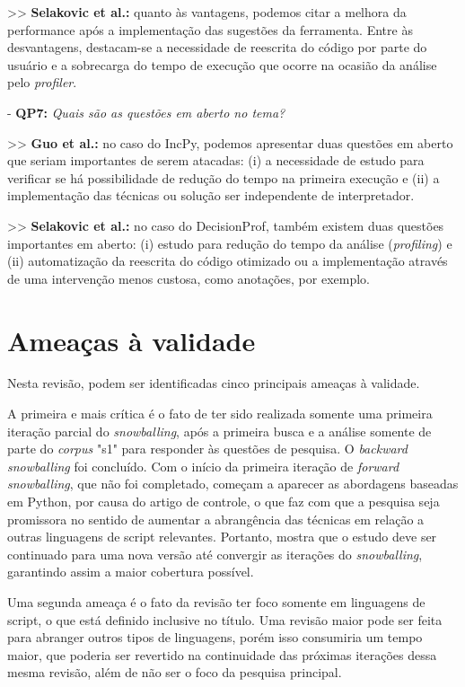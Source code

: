 \documentclass[sigconf]{acmart}
\begin{document}
>> \textbf{Selakovic et al.:} quanto às vantagens, podemos citar a melhora da performance após a implementação das sugestões da ferramenta. Entre às desvantagens, destacam-se a necessidade de reescrita do código por parte do usuário e a sobrecarga do tempo de execução que ocorre na ocasião da análise pelo \textit{profiler}.

- \textbf{QP7:} {\textit{Quais são as questões em aberto no tema?}}

>> \textbf{Guo et al.:} no caso do IncPy, podemos apresentar duas questões em aberto que seriam importantes de serem atacadas: (i) a necessidade de estudo para verificar se há possibilidade de redução do tempo na primeira execução e (ii) a implementação das técnicas ou solução ser independente de interpretador.

>> \textbf{Selakovic et al.:} no caso do DecisionProf, também existem duas questões importantes em aberto: (i) estudo para redução do tempo da análise (\textit{profiling}) e (ii) automatização da reescrita do código otimizado ou a implementação através de uma intervenção menos custosa, como anotações, por exemplo.


\section{Ameaças à validade}
Nesta revisão, podem ser identificadas cinco principais ameaças à validade.

A primeira e mais crítica é o fato de ter sido realizada somente uma primeira iteração parcial do \textit{snowballing}, após a primeira busca e a análise somente de parte do \textit{corpus} "s1" para responder às questões de pesquisa. O \textit{backward snowballing} foi concluído. Com o início da primeira iteração de \textit{forward snowballing}, que não foi completado, começam a aparecer as abordagens baseadas em Python, por causa do artigo de controle, o que faz com que a pesquisa seja promissora no sentido de aumentar a abrangência das técnicas em relação a outras linguagens de script relevantes. Portanto, mostra que o estudo deve ser continuado para uma nova versão até convergir as iterações do \textit{snowballing}, garantindo assim a maior cobertura possível.

Uma segunda ameaça é o fato da revisão ter foco somente em linguagens de script, o que está definido inclusive no título. Uma revisão maior pode ser feita para abranger outros tipos de linguagens, porém isso consumiria um tempo maior, que poderia ser revertido na continuidade das próximas iterações dessa mesma revisão, além de não ser o foco da pesquisa principal.
\end{document}
